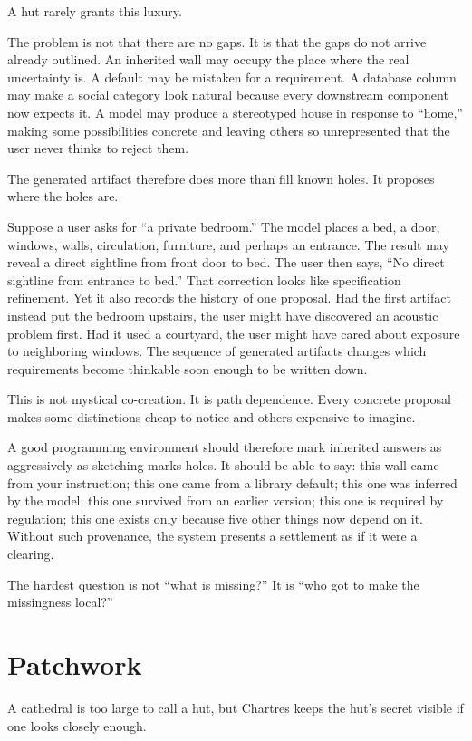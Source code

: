 \documentclass[11pt]{article}
\begin{document}
A hut rarely grants this luxury.

The problem is not that there are no gaps. It is that the gaps do not arrive already outlined. An inherited wall may occupy the place where the real uncertainty is. A default may be mistaken for a requirement. A database column may make a social category look natural because every downstream component now expects it. A model may produce a stereotyped house in response to ``home,'' making some possibilities concrete and leaving others so unrepresented that the user never thinks to reject them.

The generated artifact therefore does more than fill known holes. It proposes where the holes are.

Suppose a user asks for ``a private bedroom.'' The model places a bed, a door, windows, walls, circulation, furniture, and perhaps an entrance. The result may reveal a direct sightline from front door to bed. The user then says, ``No direct sightline from entrance to bed.'' That correction looks like specification refinement. Yet it also records the history of one proposal. Had the first artifact instead put the bedroom upstairs, the user might have discovered an acoustic problem first. Had it used a courtyard, the user might have cared about exposure to neighboring windows. The sequence of generated artifacts changes which requirements become thinkable soon enough to be written down.

This is not mystical co-creation. It is path dependence. Every concrete proposal makes some distinctions cheap to notice and others expensive to imagine.

A good programming environment should therefore mark inherited answers as aggressively as sketching marks holes. It should be able to say: this wall came from your instruction; this one came from a library default; this one was inferred by the model; this one survived from an earlier version; this one is required by regulation; this one exists only because five other things now depend on it. Without such provenance, the system presents a settlement as if it were a clearing.

The hardest question is not ``what is missing?'' It is ``who got to make the missingness local?''

\section*{Patchwork}

A cathedral is too large to call a hut, but Chartres keeps the hut's secret visible if one looks closely enough.
\end{document}
